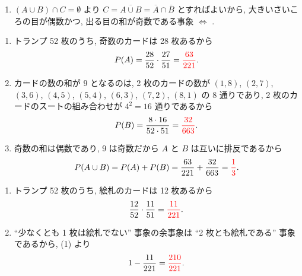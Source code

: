 \begin{qenumerate}
{\begin{enumerate}
{
			}
			\item{
				$(A \cup B) \cap C = \emptyset$ より $C = \overline{A \cup B} = \overline{A} \cap \overline{B}$ とすればよいから, 大きいさいころの目が偶数かつ, 出る目の和が奇数である事象 $\Leftrightarrow$ .
			}
		\end{enumerate}
	}
	\item{
		\begin{enumerate}
			\item{
				トランプ 52 枚のうち, 奇数のカードは 28 枚あるから
				\begin{align}
					P(A) = \frac{28}{52}\cdot\frac{27}{51} = \textcolor{red}{\frac{63}{221}}.
				\end{align}
			}
			\item{
				カードの数の和が 9 となるのは, 2 枚のカードの数が $(1, 8)$, $(2, 7)$, $(3, 6)$, $(4, 5)$, $(5, 4)$, $(6, 3)$, $(7, 2)$, $(8, 1)$ の 8 通りであり, 2 枚のカードのスートの組み合わせが $4^{2} = 16$ 通りであるから
				\begin{align}
					P(B) = \frac{8\cdot16}{52\cdot51} = \textcolor{red}{\frac{32}{663}}.
				\end{align}
			}
			\item{
				奇数の和は偶数であり, 9 は奇数だから $A$ と $B$ は互いに排反であるから
				\begin{align}
					P(A\cup B) = P(A) + P(B) = \frac{63}{221} + \frac{32}{663} = \textcolor{red}{\frac{1}{3}}.
				\end{align}
			}
		\end{enumerate}
	}
	\item{
		\begin{enumerate}
			\item{
				トランプ 52 枚のうち, 絵札のカードは 12 枚あるから
				\begin{align}
					\frac{12}{52}\cdot\frac{11}{51} = \textcolor{red}{\frac{11}{221}}.
				\end{align}
			}
			\item{
				``少なくとも 1 枚は絵札でない'' 事象の余事象は ``2 枚とも絵札である'' 事象であるから, (1) より
				\begin{align}
					1 - \frac{11}{221} = \textcolor{red}{\frac{210}{221}}.
				\end{align}
			}
		\end{enumerate}
	}
	\item{
}
\end{qenumerate}

